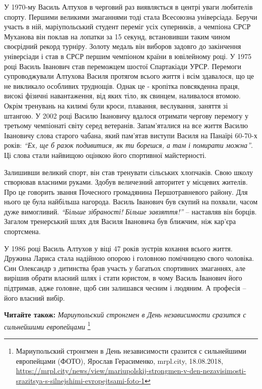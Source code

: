 У 1970-му Василь Алтухов в черговий раз виявляється в центрі уваги любителів
спорту. Першими великими змаганнями тоді стала Всесоюзна універсіада. Беручи
участь в ній, маріупольський студент переміг усіх суперників, а чемпіона СРСР
Муханова він поклав на лопатки за 15 секунд, встановивши таким чином своєрідний
рекорд турніру. Золоту медаль він виборов задовго до закінчення універсіади і
став в СРСР першим чемпіоном країни в ювілейному році. У 1975 році Василь
Іванович став переможцем шостої Спартакіади УРСР. Перемоги супроводжували
Алтухова Василя протягом всього життя і всім здавалося, що це не викликало
особливих труднощів. Однак це - кропітка повсякденна праця, високі фізичні
навантаження, від яких тіло, як свинцем, наливалося втомою. Окрім тренувань на
килимі були кроси, плавання, веслування, заняття зі штангою. У 2002 році Василю
Івановичу вдалося отримати чергову перемогу у третьому чемпіонаті світу серед
ветеранів. Запам'яталися на все життя Василю Івановичу слова старого чабана,
який пам'ятав виступи Василя на Панаїрі 60-70-х років: \emph{\enquote{Ех, ще б разок
подивитися, як ти борешся, а там і помирати можна}}. Ці слова стали найвищою
оцінкою його спортивної майстерності.


Залишивши великий спорт, він став тренувати сільських хлопчаків. Свою школу
створював власними руками. Здобув величезний авторитет у місцевих жителів. Про
це говорить звання Почесного громадянина Першотравневого району. Для нього це
була найбільша нагорода. Василь Іванович був скупий на похвали, часом дуже
вимогливий. \emph{\enquote{Більше зібраності! Більше завзяття!}} – наставляв він борців.
Загалом тренерський шлях для Василя Івановича був ближчим, ніж кар'єра
спортсмена.


У 1986 році Василь Алтухов у віці 47 років зустрів кохання всього життя.
Дружина Лариса стала надійною опорою і головною помічницею свого чоловіка. Син
Олександр з дитинства брав участь у багатьох спортивних змаганнях, але вирішив
обрати власний шлях і стати юристом, в чому Василь Іванович його підтримав,
адже головне, щоб син залишався чесним і людяним. А професія – його власний
вибір.

\textbf{Читайте також:} \emph{Мариупольский стронгмен в День независимости сразится с сильнейшими европейцами}%
\footnote{Мариупольский стронгмен в День независимости сразится с сильнейшими европейцами (ФОТО), Ярослав Герасименко, mrpl.city, 18.08.2018, \url{https://mrpl.city/news/view/mariupolskij-strongmen-v-den-nezavisimosti-srazitsya-s-silnejshimi-evropejtsami-foto-1}}

